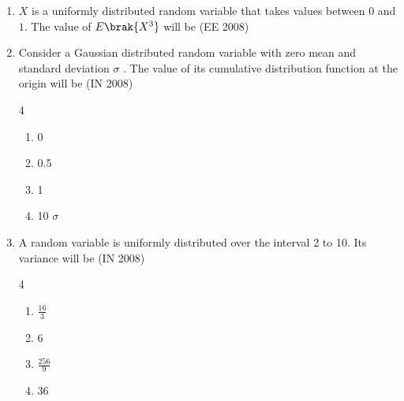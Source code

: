 \begin{enumerate}[label=\thesubsection.\arabic*,ref=\thesubsection.\theenumi]
\begin{enumerate}
\begin{multicols}{4}
\begin{enumerate}
  \item 1024
  \item 512
  \item 256
  \item 64
\end{enumerate}
\end{multicols}
\end{enumerate}
\item $X$ is a uniformly distributed random variable that takes values between $0$ and $1$. 
The value of $E\brak{X^3}$ will be %
\hfill (EE 2008)
\begin{enumerate}
\end{enumerate}
    \item Consider a Gaussian distributed random variable with zero mean and standard deviation $\sigma$ . The
value of its cumulative distribution function at the origin will be \hfill{(IN 2008)}
\begin{multicols}{4}
    \begin{enumerate} 
        \item 0
        \item 0.5
        \item 1
        \item 10 $\sigma$
    \end{enumerate}
    \end{multicols}
    
    \item  A random variable is uniformly distributed over the interval 2 to 10. Its variance will be \hfill{(IN 2008)}
    \begin{multicols}{4}
    \begin{enumerate} 
        \item \(\frac{16}{3}\) 
        \item 6
        \item \(\frac{256}{9}\)
        \item 36
    \end{enumerate}
    \end{multicols}
    
\end{enumerate}

